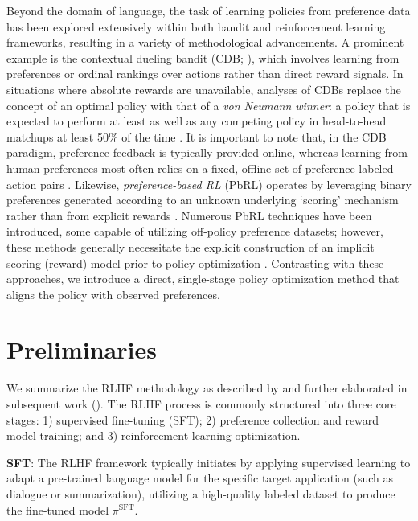 Beyond the domain of language, the task of learning policies from preference data has been explored extensively within both bandit and reinforcement learning frameworks, resulting in a variety of methodological advancements. A prominent example is the contextual dueling bandit (CDB; \cite{yue2012karmed,dudik2015contextual}), which involves learning from preferences or ordinal rankings over actions rather than direct reward signals. In situations where absolute rewards are unavailable, analyses of CDBs replace the concept of an optimal policy with that of a \textit{von Neumann winner}: a policy that is expected to perform at least as well as any competing policy in head-to-head matchups at least 50\% of the time \citep{dudik2015contextual}. It is important to note that, in the CDB paradigm, preference feedback is typically provided online, whereas learning from human preferences most often relies on a fixed, offline set of preference-labeled action pairs \citep{yan2022human}. Likewise, \textit{preference-based RL} (PbRL) operates by leveraging binary preferences generated according to an unknown underlying ‘scoring’ mechanism rather than from explicit rewards \citep{BusaFekete2014,ruiz2023dueling}. Numerous PbRL techniques have been introduced, some capable of utilizing off-policy preference datasets; however, these methods generally necessitate the explicit construction of an implicit scoring (reward) model prior to policy optimization \citep{jain2013learning,BusaFekete2014,christiano2017deep,sadigh2017active,kupcsik2018learning}. Contrasting with these approaches, we introduce a direct, single-stage policy optimization method that aligns the policy with observed preferences.

\section{Preliminaries}\label{section:prelims}

We summarize the RLHF methodology as described by \citeauthor{ziegler2020finetuning} and further elaborated in subsequent work (\citep{stiennon2022learning, bai2022training, ouyang2022training}). The RLHF process is commonly structured into three core stages: 1) supervised fine-tuning (SFT); 2) preference collection and reward model training; and 3) reinforcement learning optimization.

\textbf{SFT}: The RLHF framework typically initiates by applying supervised learning to adapt a pre-trained language model for the specific target application (such as dialogue or summarization), utilizing a high-quality labeled dataset to produce the fine-tuned model $\pi^\text{SFT}$.

